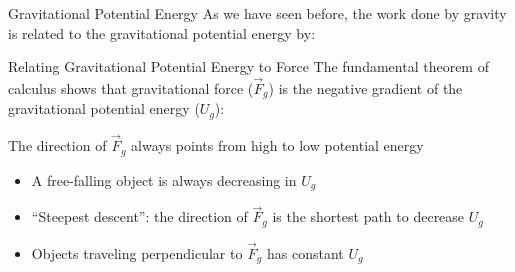 \documentclass[12pt,compress,aspectratio=169]{beamer}
\begin{document}
\begin{frame}{Gravitational Potential Energy}
  As we have seen before, the work done by gravity is related to the
  gravitational potential energy by:
  

\end{frame}



\begin{frame}{Relating Gravitational Potential Energy to Force}
  The fundamental theorem of calculus shows that gravitational force
  ($\vec F_g$) is the negative gradient of the gravitational potential energy
  ($U_g$):
  

  The direction of $\vec F_g$ always points from high to low potential energy
  \begin{itemize}
  \item A free-falling object is always decreasing in $U_g$
  \item ``Steepest descent'': the direction of $\vec F_g$ is the shortest path
    to decrease $U_g$ 
  \item Objects traveling perpendicular to $\vec F_g$ has constant $U_g$
  \end{itemize}
\end{frame}
\end{document}
